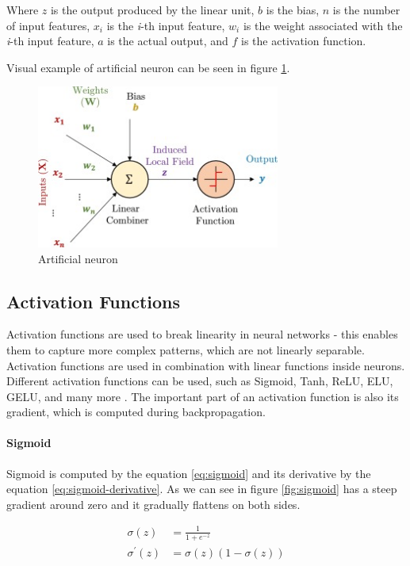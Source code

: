 Where $z$ is the output produced by the linear unit, $b$ is the bias, $n$ is the number of input features, $x_i$ is the \textit{i}-th input feature, $w_i$ is the weight associated with the \textit{i}-th input feature, $a$ is the actual output, and $f$ is the activation function.

Visual example of artificial neuron can be seen in figure \ref{fig:artificial-neuron}.

\begin{figure}[H]
\begin{centering}
\includegraphics[width=8cm]{assets/images/neuron.jpg}
\par\end{centering}
\caption{Artificial neuron \cite{Santosh2022-1}}
\label{fig:artificial-neuron}
\end{figure}

\subsection{Activation Functions}
Activation functions are used to break linearity in neural networks - this enables them to capture more complex patterns, which are not linearly separable. Activation functions are used in combination with linear functions inside neurons. Different activation functions can be used, such as Sigmoid, Tanh, ReLU, ELU, GELU, and many more \cite{Dubey2022, Aby2025}.  The important part of an activation function is also its gradient, which is computed during backpropagation. 

\paragraph{Sigmoid}
Sigmoid is computed by the equation \ref{eq:sigmoid} and its derivative by the equation \ref{eq:sigmoid-derivative}. As we can see in figure \ref{fig:sigmoid} has a steep gradient around zero and it gradually flattens on both sides.

\begin{align}
\label{eq:sigmoid}
    \sigma(z) &= \frac{1}{1+e^{-z}} \\
\label{eq:sigmoid-derivative}
    \sigma^{'}(z) &= \sigma(z)(1-\sigma(z))
\end{align}


